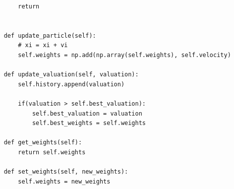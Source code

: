 \documentclass[a4paper]{article}
\begin{document}
\begin{lstlisting}
        return 
    
    
    def update_particle(self):
        # xi = xi + vi
        self.weights = np.add(np.array(self.weights), self.velocity)
        
    def update_valuation(self, valuation):
        self.history.append(valuation)
        
        if(valuation > self.best_valuation):
            self.best_valuation = valuation
            self.best_weights = self.weights
            
    def get_weights(self):
        return self.weights
    
    def set_weights(self, new_weights):
        self.weights = new_weights
    

\end{lstlisting}
\end{document}
